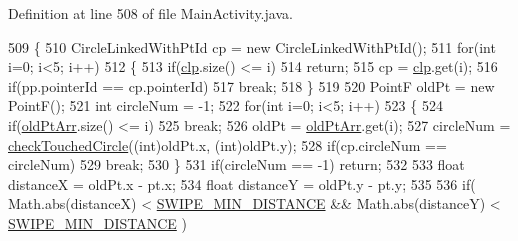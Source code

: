 Definition at line 508 of file Main\+Activity.\+java.


\begin{DoxyCode}
509         \{
510             CircleLinkedWithPtId cp = \textcolor{keyword}{new} CircleLinkedWithPtId();
511             \textcolor{keywordflow}{for}(\textcolor{keywordtype}{int} i=0; i<5; i++)
512             \{
513                 \textcolor{keywordflow}{if}(\hyperlink{classcom_1_1example_1_1multitouchsample_1_1_main_activity_1_1_my_view_a3bbc2d3fe569814080fe27c6c64eca77}{clp}.size() <= i)
514                     \textcolor{keywordflow}{return};
515                 cp = \hyperlink{classcom_1_1example_1_1multitouchsample_1_1_main_activity_1_1_my_view_a3bbc2d3fe569814080fe27c6c64eca77}{clp}.get(i);
516                 \textcolor{keywordflow}{if}(pp.pointerId == cp.pointerId)
517                     \textcolor{keywordflow}{break};
518             \}
519             
520             PointF oldPt = \textcolor{keyword}{new} PointF();
521             \textcolor{keywordtype}{int} circleNum = -1;
522             \textcolor{keywordflow}{for}(\textcolor{keywordtype}{int} i=0; i<5; i++)
523             \{
524                 \textcolor{keywordflow}{if}(\hyperlink{classcom_1_1example_1_1multitouchsample_1_1_main_activity_1_1_my_view_abf78b5272ae2cffeed639bd024d2a642}{oldPtArr}.size() <= i)
525                     \textcolor{keywordflow}{break};
526                 oldPt = \hyperlink{classcom_1_1example_1_1multitouchsample_1_1_main_activity_1_1_my_view_abf78b5272ae2cffeed639bd024d2a642}{oldPtArr}.get(i);
527                 circleNum = \hyperlink{classcom_1_1example_1_1multitouchsample_1_1_main_activity_1_1_my_view_a98456bf5be1085790b22ea0179fa2892}{checkTouchedCircle}((\textcolor{keywordtype}{int})oldPt.x, (\textcolor{keywordtype}{int})oldPt.y);
528                 \textcolor{keywordflow}{if}(cp.circleNum == circleNum)
529                     \textcolor{keywordflow}{break};
530             \}
531             \textcolor{keywordflow}{if}(circleNum == -1) \textcolor{keywordflow}{return};
532             
533             \textcolor{keywordtype}{float} distanceX = oldPt.x - pt.x;
534             \textcolor{keywordtype}{float} distanceY = oldPt.y - pt.y;
535             
536             \textcolor{keywordflow}{if}( Math.abs(distanceX) < \hyperlink{classcom_1_1example_1_1multitouchsample_1_1_main_activity_1_1_my_view_a677194aa1ca850fc0e716d725f691ba1}{SWIPE\_MIN\_DISTANCE} && Math.abs(distanceY) < 
      \hyperlink{classcom_1_1example_1_1multitouchsample_1_1_main_activity_1_1_my_view_a677194aa1ca850fc0e716d725f691ba1}{SWIPE\_MIN\_DISTANCE} )

\end{DoxyCode}
